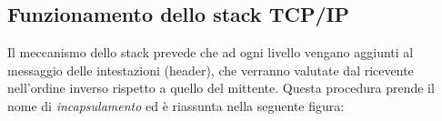 \subsection{Funzionamento dello stack TCP/IP}
%
%
%
Il meccanismo dello stack prevede che ad ogni livello vengano aggiunti al messaggio delle intestazioni (header), che verranno valutate dal ricevente nell'ordine inverso rispetto a quello del mittente.
Questa procedura prende il nome di \textit{incapsulamento} ed è riassunta nella seguente figura:


